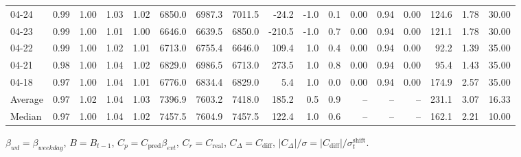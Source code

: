 \begin{threeparttable}
{\begin{tabular}{lrrrrrrrrrrrrrrrr}
  04-24 &         0.99 &           1.00 &          1.03 &          1.02 & 6850.0 & 6987.3 & 7011.5 &      -24.2 &                     -1.0 &                 0.1 &       0.00 &      0.94 &           0.00 &            124.6 &            1.78 &                  30.00 \\
  04-23 &         0.99 &           1.00 &          1.01 &          1.00 & 6646.0 & 6639.5 & 6850.0 &     -210.5 &                     -1.0 &                 0.7 &       0.00 &      0.94 &           0.00 &            121.1 &            1.78 &                  30.00 \\
  04-22 &         0.99 &           1.00 &          1.02 &          1.01 & 6713.0 & 6755.4 & 6646.0 &      109.4 &                      1.0 &                 0.4 &       0.00 &      0.94 &           0.00 &             92.2 &            1.39 &                  35.00 \\
  04-21 &         0.98 &           1.00 &          1.04 &          1.02 & 6829.0 & 6986.5 & 6713.0 &      273.5 &                      1.0 &                 0.8 &       0.00 &      0.94 &           0.00 &             95.4 &            1.43 &                  35.00 \\
  04-18 &         0.97 &           1.00 &          1.04 &          1.01 & 6776.0 & 6834.4 & 6829.0 &        5.4 &                      1.0 &                 0.0 &       0.00 &      0.94 &           0.00 &            174.9 &            2.57 &                  35.00 \\
Average &         0.97 &           1.02 &          1.04 &          1.03 & 7396.9 & 7603.2 & 7418.0 &      185.2 &                      0.5 &                 0.9 &         -- &        -- &             -- &            231.1 &            3.07 &                  16.33 \\
 Median &         0.97 &           1.00 &          1.04 &          1.02 & 7457.5 & 7604.9 & 7457.5 &      122.4 &                      1.0 &                 0.6 &         -- &        -- &             -- &            162.1 &            2.21 &                  10.00 \\
\bottomrule
\end{tabular}
}
\begin{tablenotes}\footnotesize
\item $\beta_{wd}=\beta_{weekday}$, $B=B_{t-1}$,
$C_p=C_{\text{pred}}\beta_{evt}$, $C_r=C_{\text{real}}$,
$C_\Delta=C_{\text{diff}}$, $|C_\Delta|/\sigma=|C_{\text{diff}}|/\sigma_t^{\text{shift}}$.
\end{tablenotes}
\end{threeparttable}
\endgroup
